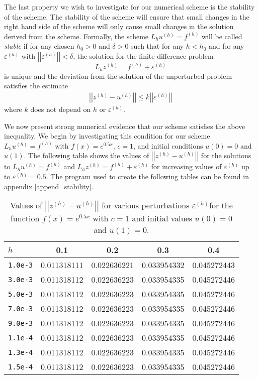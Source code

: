 The last property we wish to investigate for our numerical scheme is the
stability of the scheme. The stability of the scheme will ensure that small
changes in the right hand side of the scheme will only cause small changes in
the solution derived from the scheme. Formally, the scheme $L_h u^{(h)} = f^{(h)}$
will be called \textit{stable} if for any chosen $h_0 > 0$ and $\delta > 0$ such
that for any $h < h_0$ and for any $\varepsilon^{(h)}$ with
$\left|\left| \varepsilon^{(h)} \right|\right| < \delta$, the solution for the
finite-difference problem
$$L_h z^{(h)} = f^{(h)} + \varepsilon^{(h)}$$
is unique and the deviation from the solution of the unperturbed problem satisfies
the estimate
\begin{align}\label{stability_ineq}
  \left|\left| z^{(h)} - u^{(h)} \right|\right| \leq k \left|\left| \varepsilon^{(h)} \right|\right|
\end{align}
where $k$ does not depend on $h$ or $\varepsilon^{(h)}$.

We now present strong numerical evidence that our scheme satisfies the above
inequality.
We begin by investigating this condition for our scheme $L_h u^{(h)} = f^{(h)}$ with
$f(x) = e^{0.5x}$, $c=1$, and initial conditions $u(0) = 0$ and $u(1)$. The
following table shows the values of $\left|\left|z^{(h)} - u^{(h)}\right|\right|$
for the solutions to $L_h u^{(h)} = f^{(h)}$ and
$L_h z^{(h)} = f^{(h)} + \varepsilon^{(h)}$ for increasing values of
$\varepsilon^{(h)}$ up to $\varepsilon^{(h)} = 0.5$. The program used to create
the following tables can be found in appendix \ref{append_stability}.

\begin{table}[h!]
  \centering
  \bgroup
  \def\arraystretch{1.5}
  \begin{tabular}{| l | c | c | c | c |}
    \hline
    $h$ & 0.1 & 0.2 & 0.3 & 0.4 \\
    \hline
    \texttt{1.0e-3} & 0.011318111 & 0.022636221 & 0.033954332 & 0.045272443  \\
    \texttt{3.0e-3} & 0.011318112 & 0.022636223 & 0.033954335 & 0.045272446  \\
    \texttt{5.0e-3} & 0.011318112 & 0.022636223 & 0.033954335 & 0.045272446  \\
    \texttt{7.0e-3} & 0.011318112 & 0.022636223 & 0.033954335 & 0.045272446  \\
    \texttt{9.0e-3} & 0.011318112 & 0.022636223 & 0.033954335 & 0.045272446  \\
    \texttt{1.1e-4} & 0.011318112 & 0.022636223 & 0.033954335 & 0.045272446  \\
    \texttt{1.3e-4} & 0.011318112 & 0.022636223 & 0.033954335 & 0.045272446  \\
    \texttt{1.5e-4} & 0.011318112 & 0.022636223 & 0.033954335 & 0.045272446  \\
    \hline
  \end{tabular}
  \egroup
  \caption{Values of $\left|\left|z^{(h)} - u^{(h)}\right|\right|$ for various perturbations $\varepsilon^{(h)}$for the function $f(x) = e^{0.5x}$ with $c=1$ and initial values $u(0) = 0$ and $u(1) = 0$.}
\end{table}

